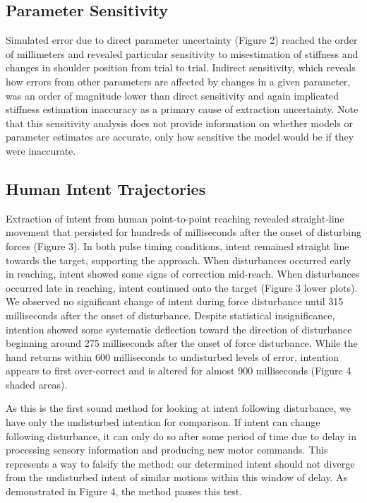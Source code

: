 \documentclass[10pt]{article}
\begin{document}
\subsection*{Parameter Sensitivity}
Simulated error due to direct parameter uncertainty (Figure 2) reached the order of millimeters and revealed particular sensitivity to misestimation of stiffness and changes in shoulder position from trial to trial. Indirect sensitivity, which reveals how errors from other parameters are affected by changes in a given parameter, was an order of magnitude lower than direct sensitivity and again implicated stiffness estimation inaccuracy as a primary cause of extraction uncertainty. Note that this sensitivity analysis does not provide information on whether models or parameter estimates are accurate, only how sensitive the model would be if they were inaccurate. 

\subsection*{Human Intent Trajectories}
Extraction of intent from human point-to-point reaching revealed straight-line movement that persisted for hundreds of milliseconds after the onset of disturbing forces (Figure 3). In both pulse timing conditions, intent remained straight line towards the target, supporting the approach.  When disturbances occurred early in reaching, intent showed some signs of correction mid-reach. When disturbances occurred late in reaching, intent continued onto the target (Figure 3 lower plots). We observed no significant change of intent during force disturbance until 315 milliseconds after the onset of disturbance. Despite statistical insignificance, intention showed some systematic deflection toward the direction of disturbance beginning around 275 milliseconds after the onset of force disturbance. While the hand returns within 600 milliseconds to undisturbed levels of error, intention appears to first over-correct and is altered for almost 900 milliseconds (Figure 4 shaded areas). 

As this is the first sound method for looking at intent following disturbance, we have only the undisturbed intention for comparison. If intent can change following disturbance, it can only do so after some period of time due to delay in processing sensory information and producing new motor commands. This represents a way to falsify the method: our determined intent should not diverge from the undisturbed intent of similar motions within this window of delay. As demonstrated in Figure 4, the method passes this test. 
\end{document}
